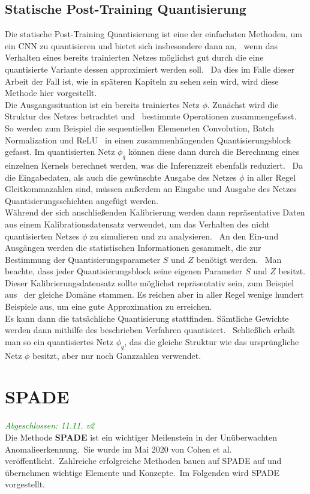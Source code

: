 \subsection{Statische Post-Training Quantisierung}\label{subsec:StatischePostTrainingQuantisierung}
Die statische Post-Training Quantisierung ist eine der einfachsten Methoden, um ein CNN zu quantisieren und bietet sich insbesondere dann an, \
wenn das Verhalten eines bereits trainierten Netzes möglichst gut durch die eine quantisierte Variante dessen approximiert werden soll. \
Da dies im Falle dieser Arbeit der Fall ist, wie in späteren Kapiteln zu sehen sein wird, wird diese Methode hier vorgestellt. \\
Die Ausgangssituation ist ein bereits trainiertes Netz $\phi$. Zunächst wird die Struktur des Netzes betrachtet und \ 
bestimmte Operationen zusammengefasst. So werden zum Beispiel die sequentiellen Elemeneten \glqq Convolution\grqq{}, \glqq Batch Normalization\grqq{} und \glqq ReLU\grqq{} \ 
in einen zusammenhängenden \glqq Quantisierungsblock\grqq{} gefasst. Im quantisierten Netz $\phi_{q}$ können diese dann durch die Berechnung eines einzelnen Kernels berechnet werden, was die Inferenzzeit ebenfalls reduziert. \
Da die Eingabedaten, als auch die gewünschte Ausgabe des Netzes $\phi$ in aller Regel Gleitkommazahlen sind, müssen außerdem an Eingabe und Ausgabe des Netzes Quantisierungsschichten angefügt werden. \\
Während der sich anschließenden Kalibrierung werden dann repräsentative Daten aus einem Kalibrationsdatensatz verwendet, um das Verhalten des nicht quantisierten Netzes $\phi$ zu simulieren und zu analysieren. \
An den Ein-und Ausgängen werden die statistischen Informationen gesammelt, die zur Bestimmung der Quantisierungsparameter $S$ und $Z$ benötigt werden. \
Man beachte, dass jeder Quantisierungsblock seine eigenen Parameter $S$ und $Z$ besitzt. Dieser Kalibrierungsdatensatz sollte möglichst repräsentativ sein, zum Beispiel aus \ 
der gleiche Domäne stammen. Es reichen aber in aller Regel wenige hundert Beispiele aus, um eine gute Approximation zu erreichen. \\
Es kann dann die tatsächliche Quantisierung stattfinden. Sämtliche Gewichte werden dann mithilfe des beschrieben Verfahren quantisiert. \
Schließlich erhält man so ein quantisiertes Netz $\phi_{q}$, das die gleiche Struktur wie das ursprüngliche Netz $\phi$ besitzt, aber nur noch Ganzzahlen verwendet. \

\section{SPADE}\label{sec:SPADE}
\textcolor{green}{\textit{Abgeschlossen: 11.11. v2}}\\
Die Methode \textbf{SPADE} \cite{spade} ist ein wichtiger Meilenstein in der Unüberwachten Anomalieerkennung.\
Sie wurde im Mai 2020 von Cohen et al. veröffentlicht.\
Zahlreiche erfolgreiche Methoden bauen auf SPADE auf und übernehmen wichtige Elemente und Konzepte.\
Im Folgenden wird SPADE vorgestellt.\
